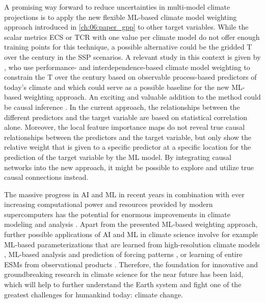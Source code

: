 A promising way forward to reduce uncertainties in multi-model climate
projections is to apply the new flexible \acs{ML}-based climate model weighting
approach introduced in \cref{ch:06:paper_gpp} to other target variables. While
the scalar metrics \ac{ECS} or \ac{TCR} with one value per climate model do not
offer enough training points for this technique, a possible alternative could
be the gridded \acl{T} over the  century in the \ac{SSP} scenarios. A
relevant study in this context is given by \textcite{Brunner2020}, who use
performance- and interdependence-based climate model weighting to constrain the
\acl{T} over the  century based on observable process-based predictors
of today's climate and which could serve as a possible baseline for the new
\acs{ML}-based weighting approach. An exciting and valuable addition to the
method could be causal inference \autocite{Nowack2020, Runge2019}. In the
current approach, the relationships between the different predictors and the
target variable are based on statistical correlation alone. Moreover, the local
feature importance maps do not reveal true causal relationships between the
predictors and the target variable, but only show the relative weight that is
given to a specific predictor at a specific location for the prediction of the
target variable by the \ac{ML} model. By integrating causal networks into the
new approach, it might be possible to explore and utilize true causal
connections instead.

The massive progress in \ac{AI} and \ac{ML} in recent years in combination with
ever increasing computational power and resources provided by modern
supercomputers has the potential for enormous improvements in climate modeling
and analysis \autocite{Reichstein2019}. Apart from the presented \acs{ML}-based
weighting approach, further possible applications of \ac{AI} and \ac{ML} in
climate science involve for example \acs{ML}-based parameterizations that are
learned from high-resolution climate models \autocite{Gentine2018, Rasp2018},
\acs{ML}-based analysis and prediction of forcing patterns
\autocite{Barnes2019, Mansfield2020}, or learning of entire \acp{ESM} from
observational products \autocite{Geer2021}. Therefore, the foundation for
innovative and groundbreaking research in climate science for the near future
has been laid, which will help to further understand the Earth system and fight
one of the greatest challenges for humankind today: climate change.
